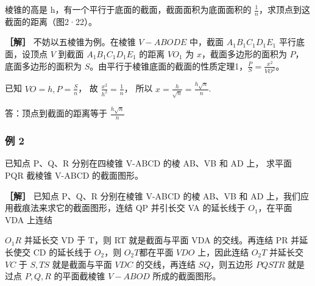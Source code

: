棱锥的高是 h，有一个平行于底面的截面，截面面积为底面面积的
\(\frac{1}{n}\)，求顶点到这截面的距离（图2·22）。

\textbf{［解］} 不妨以五棱锥为例。在棱锥 \(V - ABODE\) 中，截面
\(A_{1}B_{1}C_{1}D_{1}E_{1}\) 平行底面，设顶点 \(V\) 到截面
\(A_{1}B_{1}C_{1}D_{1}E_{1}\) 的距离 \(VO_{1}\) 为
\(x\)，截面多边形的面积为 \(P\)，底面多边形的面积为
\(S\)。由平行于棱锥底面的截面的性质定理1，\(\frac{P}{S} = \frac{x^2}{VO^2}\)。

已知 \(VO = h, P = \frac{S}{n}\)， 故
\(\frac{x^2}{h^2} = \frac{1}{n}\)， 所以
\(x = \frac{h}{\sqrt{n}} = \frac{h\sqrt{n}}{n}\).

答：顶点到截面的距离等于 \(\frac{h\sqrt{n}}{n}\)

\subsubsection{例 2}

已知点 P、Q、R 分别在四棱锥 V-ABCD 的棱 AB、VB 和 AD 上， 求平面 PQR
截棱锥 V-ABCD 的截面图形。

\textbf{［解］} 已知点 P、Q、R 分别在棱锥 V-ABCD 的棱 AB、VB 和 AD
上，我们应用截痕法来求它的截面图形，连结 QP 并引长交 VA 的延长线于
\(O_{1}\)，在平面 VDA 上连结

\(O_{1}R\) 并延长交 VD 于 T，则 RT 就是截面与平面 VDA 的交线。再连结 PR
并延长使交 CD 的延长线于 \(O_{2}\)，则 \(O_{2}T\)都在平面 \(VDO\)
上，因此连结 \(O_{2}T\) 并延长交 \(VC\) 于 \(S, TS\) 就是截面与平面
\(VDC\) 的交线，再连结 \(SQ\)，则五边形 \(PQSTR\) 就是过点 \(P, Q, R\)
的平面截棱锥 \(V - ABOD\) 所成的截面图形。

